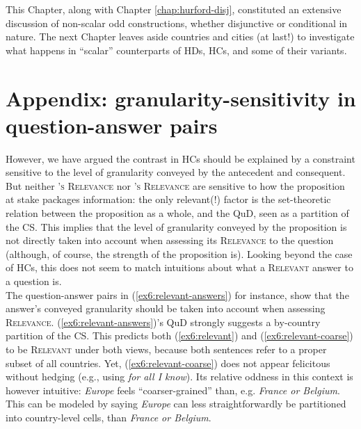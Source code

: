 This Chapter, along with Chapter \ref{chap:hurford-disj}, constituted an extensive discussion of non-scalar odd constructions, whether disjunctive or conditional in nature. The next Chapter leaves aside countries and cities (at last!) to investigate what happens in ``scalar'' counterparts of HDs, HCs, and some of their variants. 

\iffalse

\section{Appendix: granularity-sensitivity in question-answer pairs}

However, we have argued the contrast in HCs should be explained by a constraint sensitive to the level of granularity conveyed by the antecedent and consequent. But neither \textsc{\citeauthor*{Lewis1988}'s Relevance} nor \textsc{\citeauthor{Roberts2012}'s Relevance} are sensitive to how the proposition at stake packages information: the only relevant(!) factor is the set-theoretic relation between the proposition as a whole, and the QuD, seen as a partition of the CS. This implies that the level of granularity conveyed by the proposition is not directly taken into account when assessing its \textsc{Relevance} to the question (although, of course, the strength of the proposition is). Looking beyond the case of HCs, this does not seem to match intuitions about what a \textsc{Relevant} answer to a question is.\\

The question-answer pairs in (\ref{ex6:relevant-answers}) for instance, show that the answer's conveyed granularity should be taken into account when assessing \textsc{Relevance}. (\ref{ex6:relevant-answers})'s QuD strongly suggests a by-country partition of the CS. This predicts both (\ref{ex6:relevant}) and (\ref{ex6:relevant-coarse}) to be \textsc{Relevant} under both views, because both sentences refer to a proper subset of all countries. Yet, (\ref{ex6:relevant-coarse}) does not appear felicitous without hedging (e.g., using \textit{for all I know}). Its relative oddness in this context is however intuitive: \textit{Europe} feels ``coarser-grained'' than, e.g. \textit{France or Belgium}. This can be modeled by saying \textit{Europe} can less straightforwardly be partitioned into country-level cells, than \textit{France or Belgium}. 

